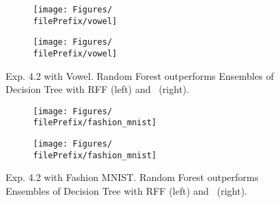 \begin{figure}[H]
  \centering
  \renewcommand{\filePrefix}{\undPrefix/rff}
  \begin{subfigure}[t]{0.5\linewidth}
    \centering\captionsetup{width=.8\linewidth}\texttt{[image: Figures/\\filePrefix/vowel]}
    \label{fig:\undPrefix_vowel}
  \end{subfigure}%
  \renewcommand{\filePrefix}{\undPrefix/nys}%
  \begin{subfigure}[t]{0.5\linewidth}
    \centering\captionsetup{width=.8\linewidth}\texttt{[image: Figures/\\filePrefix/vowel]}
    \label{fig:\undPrefix_vowel}
  \end{subfigure}
  \caption*{Exp. 4.2 with Vowel. Random Forest outperforms Ensembles of Decision Tree with RFF (left) and \Nys\ (right).}
\end{figure}


\begin{figure}[H]
  \centering
  \renewcommand{\filePrefix}{\undPrefix/rff}
  \begin{subfigure}[t]{0.5\linewidth}
    \centering\captionsetup{width=.8\linewidth}\texttt{[image: Figures/\\filePrefix/fashion\_mnist]}
    \label{fig:\undPrefix_vowel}
  \end{subfigure}%
  \renewcommand{\filePrefix}{\undPrefix/nys}%
  \begin{subfigure}[t]{0.5\linewidth}
    \centering\captionsetup{width=.8\linewidth}\texttt{[image: Figures/\\filePrefix/fashion\_mnist]}
    \label{fig:\undPrefix_vowel}
  \end{subfigure}
  \caption*{Exp. 4.2 with Fashion MNIST. Random Forest outperforms Ensembles of Decision Tree with RFF (left) and \Nys\ (right).}
\end{figure}




